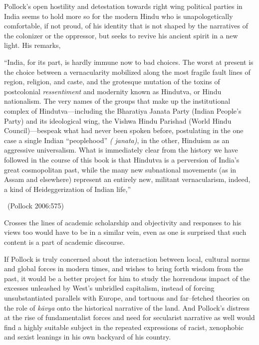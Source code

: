 Pollock’s open hostility and detestation towards right wing political parties in India seems to hold more so for the modern Hindu who is unapologetically comfortable, if not proud, of his identity that is not shaped by the narratives of the colonizer or the oppressor, but seeks to revive his ancient spirit in a new light. His remarks,

\begin{myquote}
“India, for its part, is hardly immune now to bad choices. The worst at present is the choice between a vernacularity mobilized along the most fragile fault lines of region, religion, and caste, and the grotesque mutation of the toxins of postcolonial \textit{ressentiment} and modernity known as Hindutva, or Hindu nationalism. The very names of the groups that make up the institutional complex of Hindutva—including the Bharatiya Janata Party (Indian People’s Party) and its ideological wing, the Vishwa Hindu Parishad (World Hindu Council)—bespeak what had never been spoken before, postulating in the one case a single Indian “peoplehood” \textit{( janata)}, in the other, Hinduism as an aggressive universalism. What is immediately clear from the history we have followed in the course of this book is that Hindutva is a perversion of India’s great cosmopolitan past, while the many new subnational movements (as in Assam and elsewhere) represent an entirely new, militant vernacularism, indeed, a kind of Heideggerization of Indian life,” 

~\hfill (Pollock 2006:575)
\end{myquote}

Crosses the lines of academic scholarship and objectivity and responses to his views too would have to be in a similar vein, even as one is surprised that such content is a part of academic discourse.

If Pollock is truly concerned about the interaction between local, cultural norms and global forces in modern times, and wishes to bring forth wisdom from the past, it would be a better project for him to study the horrendous impact of the excesses unleashed by West’s unbridled capitalism, instead of forcing unsubstantiated parallels with Europe, and tortuous and far–fetched theories on the role of \textit{kāvya} onto the historical narrative of the land. And Pollock’s distress at the rise of fundamentalist forces and need for secularist narrative as well would find a highly suitable subject in the repeated expressions of racist, xenophobic and sexist leanings in his own backyard of his country.

